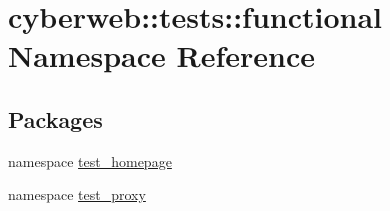 \hypertarget{namespacecyberweb_1_1tests_1_1functional}{\section{cyberweb\-:\-:tests\-:\-:functional \-Namespace \-Reference}
\label{namespacecyberweb_1_1tests_1_1functional}
}
\subsection*{\-Packages}
\begin{DoxyCompactItemize}
\item 
namespace \hyperlink{namespacecyberweb_1_1tests_1_1functional_1_1test__homepage}{test\-\_\-homepage}
\item 
namespace \hyperlink{namespacecyberweb_1_1tests_1_1functional_1_1test__proxy}{test\-\_\-proxy}
\end{DoxyCompactItemize}
